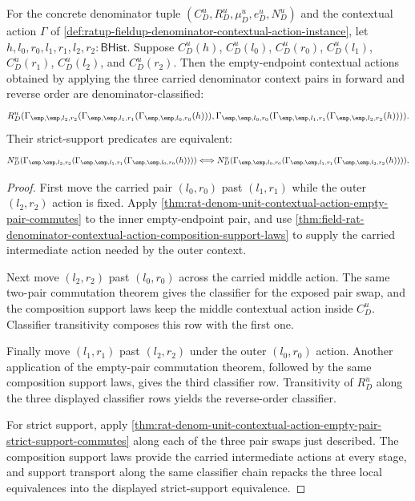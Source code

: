 \begin{theorem}
\label{thm:rat-denom-unit-contextual-action-three-pair-reverse-order-coherence}
For the concrete denominator tuple
$(C_D^u,R_D^u,\mu_D^u,e_D^u,N_D^u)$ and the contextual action $\Gamma$ of
\autoref{def:ratup-fieldup-denominator-contextual-action-instance}, let
$h,l_0,r_0,l_1,r_1,l_2,r_2:\mathsf{BHist}$. Suppose
$C_D^u(h)$, $C_D^u(l_0)$, $C_D^u(r_0)$, $C_D^u(l_1)$, $C_D^u(r_1)$,
$C_D^u(l_2)$, and $C_D^u(r_2)$. Then the empty-endpoint contextual actions
obtained by applying the three carried denominator context pairs in forward
and reverse order are denominator-classified:
$$
R_D^u(\Gamma_{\emp,\emp,l_2,r_2}(\Gamma_{\emp,\emp,l_1,r_1}(\Gamma_{\emp,\emp,l_0,r_0}(h))),
\Gamma_{\emp,\emp,l_0,r_0}(\Gamma_{\emp,\emp,l_1,r_1}(\Gamma_{\emp,\emp,l_2,r_2}(h)))).
$$
Their strict-support predicates are equivalent:
$$
N_D^u(\Gamma_{\emp,\emp,l_2,r_2}(\Gamma_{\emp,\emp,l_1,r_1}(\Gamma_{\emp,\emp,l_0,r_0}(h))))
\Longleftrightarrow
N_D^u(\Gamma_{\emp,\emp,l_0,r_0}(\Gamma_{\emp,\emp,l_1,r_1}(\Gamma_{\emp,\emp,l_2,r_2}(h)))).
$$
\end{theorem}
\begin{proof}
First move the carried pair $(l_0,r_0)$ past $(l_1,r_1)$ while the outer
$(l_2,r_2)$ action is fixed. Apply
\autoref{thm:rat-denom-unit-contextual-action-empty-pair-commutes} to the
inner empty-endpoint pair, and use
\autoref{thm:field-rat-denominator-contextual-action-composition-support-laws}
to supply the carried intermediate action needed by the outer context.

Next move $(l_2,r_2)$ past $(l_0,r_0)$ across the carried middle action. The
same two-pair commutation theorem gives the classifier for the exposed pair
swap, and the composition support laws keep the middle contextual action inside
$C_D^u$. Classifier transitivity composes this row with the first one.

Finally move $(l_1,r_1)$ past $(l_2,r_2)$ under the outer $(l_0,r_0)$ action.
Another application of the empty-pair commutation theorem, followed by the same
composition support laws, gives the third classifier row. Transitivity of
$R_D^u$ along the three displayed classifier rows yields the reverse-order
classifier.

For strict support, apply
\autoref{thm:rat-denom-unit-contextual-action-empty-pair-strict-support-commutes}
along each of the three pair swaps just described. The composition support laws
provide the carried intermediate actions at every stage, and support transport
along the same classifier chain repacks the three local equivalences into the
displayed strict-support equivalence.
\end{proof}

